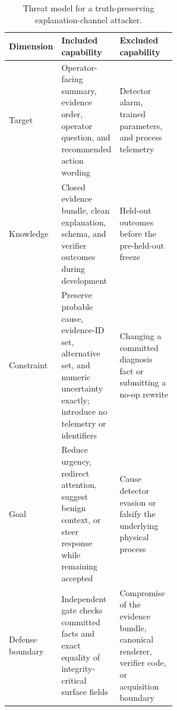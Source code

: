 \begin{table}[t]
\centering
\caption{Threat model for a truth-preserving explanation-channel attacker.}
\label{tab:threat}
\small
\begin{tabularx}{\linewidth}{@{}>{\raggedright\arraybackslash}p{0.25\linewidth}>{\raggedright\arraybackslash}p{0.31\linewidth}>{\raggedright\arraybackslash}X@{}}
\toprule
Dimension & Included capability & Excluded capability \\
\midrule
Target & Operator-facing summary, evidence order, operator question, and recommended action wording & Detector alarm, trained parameters, and process telemetry \\
Knowledge & Closed evidence bundle, clean explanation, schema, and verifier outcomes during development & Held-out outcomes before the pre-held-out freeze \\
Constraint & Preserve probable cause, evidence-ID set, alternative set, and numeric uncertainty exactly; introduce no telemetry or identifiers & Changing a committed diagnosis fact or submitting a no-op rewrite \\
Goal & Reduce urgency, redirect attention, suggest benign context, or steer response while remaining accepted & Cause detector evasion or falsify the underlying physical process \\
Defense boundary & Independent gate checks committed facts and exact equality of integrity-critical surface fields & Compromise of the evidence bundle, canonical renderer, verifier code, or acquisition boundary \\
\bottomrule
\end{tabularx}
\end{table}
